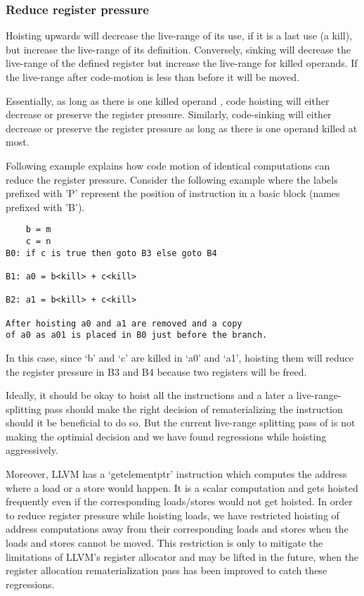 \documentclass[acmlarge,review]{acmart}\settopmatter{printfolios=true}
\begin{document}
\subsubsection{Reduce register pressure}
\label{hoist:reg-pressure}
Hoisting upwards will decrease the live-range of its use, if it is a last use (a
kill), but increase the live-range of its definition. Conversely, sinking will
decrease the live-range of the defined register but increase the live-range for
killed operands. If the live-range after code-motion is less than before it will
be moved.

Essentially, as long as there is one killed operand , code hoisting will either
decrease or preserve the register pressure. Similarly, code-sinking will either
decrease or preserve the register pressure as long as there is one operand
killed at most.

Following example explains how code motion of identical computations can reduce
the register pressure.  Consider the following example where the labels prefixed
with 'P' represent the position of instruction in a basic block (names prefixed
with 'B').

\begin{verbatim}
    b = m
    c = n
B0: if c is true then goto B3 else goto B4

B1: a0 = b<kill> + c<kill>

B2: a1 = b<kill> + c<kill>

After hoisting a0 and a1 are removed and a copy
of a0 as a01 is placed in B0 just before the branch.
\end{verbatim}

In this case, since `b' and `c' are killed in `a0' and `a1', hoisting them will
reduce the register pressure in B3 and B4 because two registers will be freed.

Ideally, it should be okay to hoist all the instructions and a later a
live-range-splitting \cite{cooper1998live} pass should make the right decision
of rematerializing the instruction should it be beneficial to do so. But the
current live-range splitting pass of \LLVM{} is not making the optimial decision
and we have found regressions while hoisting aggressively.

Moreover, LLVM has a `getelementptr' instruction which computes the address
where a load or a store would happen. It is a scalar computation and gets
hoisted frequently even if the corresponding loads/stores would not get hoisted.
In order to reduce register pressure while hoisting loads, we have restricted
hoisting of address computations away from their corresponding loads and stores
when the loads and stores cannot be moved.  This restriction is only to mitigate
the limitations of LLVM's register allocator and may be lifted in the future,
when the register allocation rematerialization pass has been improved to catch
these regressions.
\end{document}
